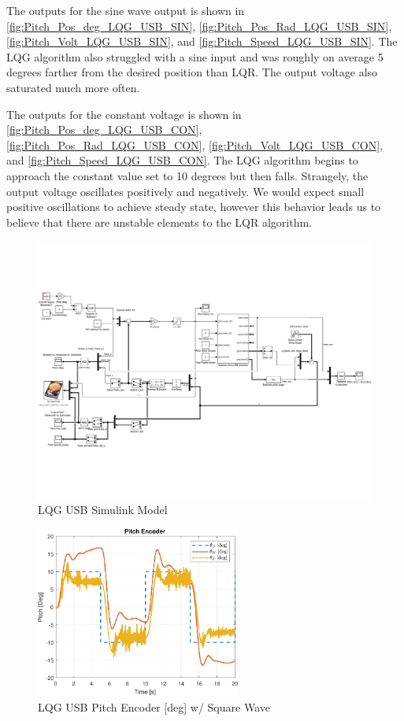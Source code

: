 \documentclass[fontsize=11pt, %
                             paper=letter, %
                             openany, %
                             captions=tableheading,
                             index=totoc,
                             hyperref]{labbook}
\begin{document}
\begin{addmargin}[0cm]{0cm}
The outputs for the sine wave output is shown in
\autoref{fig:Pitch_Pos_deg_LQG_USB_SIN},
\autoref{fig:Pitch_Pos_Rad_LQG_USB_SIN},
\autoref{fig:Pitch_Volt_LQG_USB_SIN}, and
\autoref{fig:Pitch_Speed_LQG_USB_SIN}.
The LQG algorithm also struggled with a sine input and was roughly on average 5 degrees farther from the desired position than LQR.  The output voltage also saturated much more often.

The outputs for the constant voltage is shown in
\autoref{fig:Pitch_Pos_deg_LQG_USB_CON},
\autoref{fig:Pitch_Pos_Rad_LQG_USB_CON},
\autoref{fig:Pitch_Volt_LQG_USB_CON}, and
\autoref{fig:Pitch_Speed_LQG_USB_CON}.
The LQG algorithm begins to approach the constant value set to 10 degrees but then falls.  Strangely, the output voltage oscillates positively and negatively.  We would expect small positive oscillations to achieve steady state, however this behavior leads us to believe that there are unstable elements to the LQR algorithm.

\begin{figure}[h]
  \centering
  \includegraphics[width=1\textwidth]{figs/img/LQG_USB}
  \caption{LQG USB Simulink Model}
  \label{fig:LQG_USB}
\end{figure}

\begin{figure}[h]
  \centering
  \includegraphics[width=0.6\textwidth]{figs/matlab/LQG_USB/Pitch_Pos_deg_LQG_USB_SQU}
  \caption{LQG USB Pitch Encoder [deg] w/ Square Wave}
  \label{fig:Pitch_Pos_deg_LQG_USB_SQU}
\end{figure}


\end{addmargin}
\end{document}
